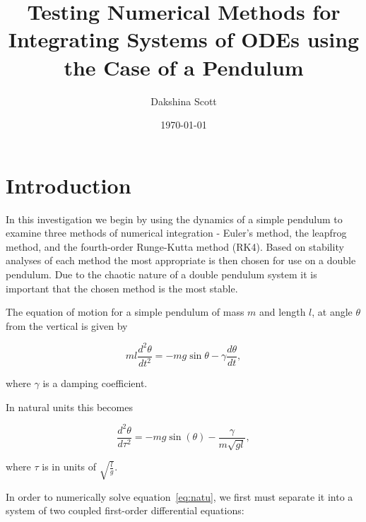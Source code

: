 \documentclass[a4paper,11pt,twoside]{article}
\begin{document}
\title{Testing Numerical Methods for Integrating Systems of ODEs using 
the Case of a Pendulum}
\author{Dakshina Scott}
\date{\today}
\maketitle

\begin{abstract}

\end{abstract}


\tableofcontents


\section{Introduction}

In this investigation we begin by using the dynamics of a simple 
pendulum to examine three methods of numerical integration - Euler's
method, the leapfrog method, and the fourth-order Runge-Kutta 
method (RK4). Based on stability analyses of each method the most 
appropriate is then chosen for use on a double pendulum. Due to the 
chaotic nature of a double pendulum system it is important that 
the chosen method is the most stable. 

The equation of motion for a simple pendulum of mass \(m\) and length 
\(l\), at angle \(\theta\) from the vertical is given by

\begin{equation}
	\label{eq:eom}
	ml\frac{d^{2} \theta}{d t^{2}} = - mg\sin{\theta} - \gamma\frac{d \theta}{d t},
\end{equation}

where \(\gamma\) is a damping coefficient.

In natural units this becomes 

\begin{equation}
	\label{eq:natu}
	\frac{d^{2} \theta}{d \tau^{2}} = - mg\sin(\theta) - \frac{\gamma}{m\sqrt{gl}},
\end{equation}

where \(\tau\) is in units of \(\sqrt{\frac{l}{g}}\).

In order to numerically solve equation~\ref{eq:natu}, we first must 
separate it into a system of two coupled first-order differential 
equations:
\end{document}
